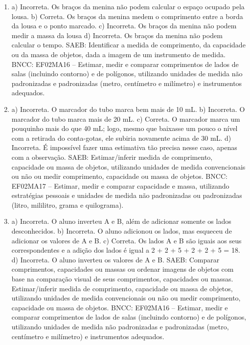 \begin{enumerate}
\item
a) Incorreta. Os braços da menina não podem calcular o espaço ocupado pela lousa.
b) Correta. Os braços da menina medem o comprimento entre a borda da lousa e o ponto marcado.
c) Incorreta. Os braços da menina não podem medir a massa da lousa
d) Incorreta. Os braços da menina não podem calcular o tempo.
SAEB: Identificar a medida de comprimento, da capacidade ou da
massa de objetos, dada a imagem de um instrumento de medida.
BNCC: EF02MA16 -- Estimar, medir e comparar comprimentos de lados de
salas (incluindo contorno) e de polígonos, utilizando unidades de medida não padronizadas e
padronizadas (metro, centímetro e milímetro) e instrumentos adequados.

\item
a) Incorreta. O marcador do tubo marca bem mais de 10 mL.
b) Incorreta. O marcador do tubo marca mais de 20 mL.
c) Correta. O marcador marca um pouquinho mais do que 40 mL; logo, mesmo que baixasse um pouco o nível com a retirada do conta-gotas, ele subiria novamente acima de 30 mL.
d) Incorreta. É impossível fazer uma estimativa tão precisa nesse caso, apenas com a observação.
SAEB: Estimar/inferir medida de comprimento, capacidade ou
massa de objetos, utilizando unidades de medida convencionais ou não ou
medir comprimento, capacidade ou massa de objetos.
BNCC: EF02MA17 -- Estimar, medir e comparar capacidade e massa,
utilizando estratégias pessoais e unidades de medida não padronizadas ou padronizadas (litro, mililitro,
grama e quilograma).

\item
a) Incorreta. O aluno inverteu A e B, além de adicionar somente os lados desconhecidos.
b) Incorreta. O aluno adicionou os lados, mas esqueceu de adicionar os valores de A e B.
c) Correta. Os lados A e B são iguais aos seus correspondentes e a adição dos lados é igual a 2 + 2 + 5 + 2 + 2 + 5 = 18.
d) Incorreta. O aluno inverteu os valores de A e B.
SAEB: Comparar comprimentos, capacidades ou massas ou ordenar
imagens de objetos com base na comparação visual de seus comprimentos,
capacidades ou massas.
Estimar/inferir medida de comprimento, capacidade ou massa de
objetos, utilizando unidades de medida convencionais ou não ou medir
comprimento, capacidade ou massa de objetos.
BNCC: EF02MA16 -- Estimar, medir e comparar comprimentos de lados de
salas (incluindo contorno) e de polígonos, utilizando unidades de medida não padronizadas e
padronizadas (metro, centímetro e milímetro) e instrumentos adequados.
\end{enumerate}

